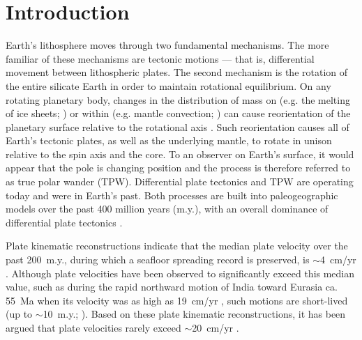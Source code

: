 \section{Introduction}

Earth's lithosphere moves through two fundamental mechanisms. The more familiar of these mechanisms are tectonic motions --- that is, differential movement between lithospheric plates. The second mechanism is the rotation of the entire silicate Earth in order to maintain rotational equilibrium. On any rotating planetary body, changes in the distribution of mass on (e.g. the melting of ice sheets; \citealp{Mitrovica2005a, Matsuyama2010a, Cambiotti2010a}) or within (e.g. mantle convection; \citealp{Spada1992a}) can cause reorientation of the planetary surface relative to the rotational axis \citep{Evans2003a, Matsuyama2014a}. Such reorientation causes all of Earth's tectonic plates, as well as the underlying mantle, to rotate in unison relative to the spin axis and the core. To an observer on Earth's surface, it would appear that the pole is changing position and the process is therefore referred to as true polar wander (TPW). Differential plate tectonics and TPW are operating today and were in Earth's past. Both processes are built into paleogeographic models over the past 400 million years (m.y.), with an overall dominance of differential plate tectonics \citep{Steinberger2008a, Torsvik2012a}.

Plate kinematic reconstructions indicate that the median plate velocity over the past 200~m.y., during which a seafloor spreading record is preserved, is $\sim$4~cm/yr \citep{Zahirovic2015a}. Although plate velocities have been observed to significantly exceed this median value, such as during the rapid northward motion of India toward Eurasia ca. 55~Ma when its velocity was as high as 19~cm/yr \citep{Hinsbergen2011a, Zahirovic2012a}, such motions are short-lived (up to $\sim$10~m.y.; \citealp{Zahirovic2015a}). Based on these plate kinematic reconstructions, it has been argued that plate velocities rarely exceed $\sim$20~cm/yr \citep{Meert1993a, Zahirovic2015a}.


